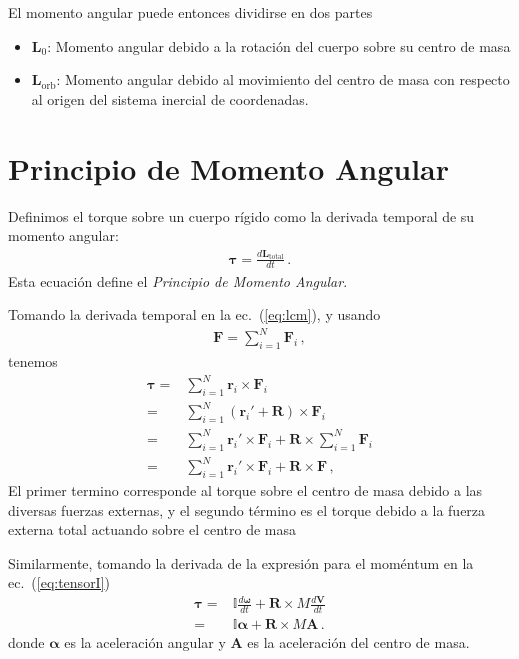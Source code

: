 El momento angular puede entonces dividirse en dos partes
\begin{itemize}
\item $\mathbf{L}_0$: Momento angular debido a la rotación del cuerpo sobre su centro de masa
\item $\mathbf{L}_{\text{orb}}$: Momento angular debido al movimiento del centro de masa con respecto al origen del sistema inercial de coordenadas.
\end{itemize}


\section{Principio de Momento Angular}

Definimos el torque sobre un cuerpo rígido como la derivada temporal de su momento angular:
\begin{align}
  \label{eq:torque}
  \boldsymbol{\tau}=\frac{d\mathbf{L}_{\mathrm{total}}}{dt}\,.
\end{align}
Esta ecuación define el \emph{Principio de Momento Angular}. 

Tomando la derivada temporal en la ec.~(\ref{eq:lcm}), y usando
\begin{align}
  \mathbf{F}=\sum_{i=1}^N\mathbf{F}_i\,,
\end{align}
tenemos
\begin{align}
  \boldsymbol{\tau}=&\sum_{i=1}^N\mathbf{r}_i\times \mathbf{F}_i\nonumber\\
=&\sum_{i=1}^N\left(\mathbf{r}_i'+\mathbf{R}\right)\times \mathbf{F}_i\nonumber\\
=&\sum_{i=1}^N\mathbf{r}_i'\times \mathbf{F}_i+\mathbf{R}\times \sum_{i=1}^N\mathbf{F}_i\nonumber\\
=&\sum_{i=1}^N\mathbf{r}_i'\times \mathbf{F}_i+\mathbf{R}\times\mathbf{F}\,,
\end{align}
El primer termino corresponde al torque sobre el centro de masa debido a las diversas fuerzas externas, y el segundo término es el torque debido a la fuerza externa total actuando sobre el centro de masa

Similarmente, tomando la derivada de la expresión para el moméntum en la ec.~(\ref{eq:tensorI})
\begin{align}
  \boldsymbol{\tau}=&\mathbb{I}\frac{d\boldsymbol{\omega}}{dt}+\mathbf{R}\times M\frac{d\mathbf{V}}{dt}\nonumber\\
=&\mathbb{I}\boldsymbol{\alpha}+\mathbf{R}\times M\mathbf{A}\,.
\end{align}
donde $\boldsymbol{\alpha}$ es la aceleración angular y $\mathbf{A}$ es la aceleración del centro de masa.




